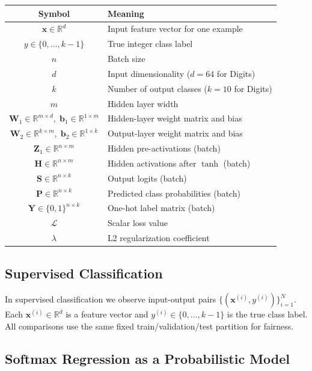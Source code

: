 \documentclass[11pt]{article}
\newcommand{\R}{\mathbb{R}}
\newcommand{\W}{\mathbf{W}}
\newcommand{\bx}{\mathbf{x}}
\newcommand{\bb}{\mathbf{b}}
\newcommand{\bH}{\mathbf{H}}
\newcommand{\bS}{\mathbf{S}}
\newcommand{\bP}{\mathbf{P}}
\newcommand{\bY}{\mathbf{Y}}
\newcommand{\bZ}{\mathbf{Z}}
\newcommand{\loss}{\mathcal{L}}
\begin{document}
\begin{center}
\renewcommand{\arraystretch}{1.35}
\begin{tabular}{cl}
\toprule
Symbol & Meaning \\
\midrule
$\bx\in\R^d$ & Input feature vector for one example \\
$y\in\{0,\ldots,k{-}1\}$ & True integer class label \\
$n$ & Batch size \\
$d$ & Input dimensionality ($d=64$ for Digits) \\
$k$ & Number of output classes ($k=10$ for Digits) \\
$m$ & Hidden layer width \\
$\W_1\in\R^{m\times d},\;\bb_1\in\R^{1\times m}$ & Hidden-layer weight matrix and bias \\
$\W_2\in\R^{k\times m},\;\bb_2\in\R^{1\times k}$ & Output-layer weight matrix and bias \\
$\bZ_1\in\R^{n\times m}$ & Hidden pre-activations (batch) \\
$\bH  \in\R^{n\times m}$ & Hidden activations after $\tanh$ (batch) \\
$\bS  \in\R^{n\times k}$ & Output logits (batch) \\
$\bP  \in\R^{n\times k}$ & Predicted class probabilities (batch) \\
$\bY  \in\{0,1\}^{n\times k}$ & One-hot label matrix (batch) \\
$\loss$ & Scalar loss value \\
$\lambda$ & L2 regularization coefficient \\
\bottomrule
\end{tabular}
\end{center}

\subsection{Supervised Classification}

In supervised classification we observe input-output pairs
$\{(\bx^{(i)},y^{(i)})\}_{i=1}^N$.
Each $\bx^{(i)}\in\R^d$ is a feature vector and
$y^{(i)}\in\{0,\ldots,k{-}1\}$ is the true class label.
All comparisons use the same fixed train/validation/test partition for fairness.

\subsection{Softmax Regression as a Probabilistic Model}
\label{subsec:softmax_prob}
\end{document}
